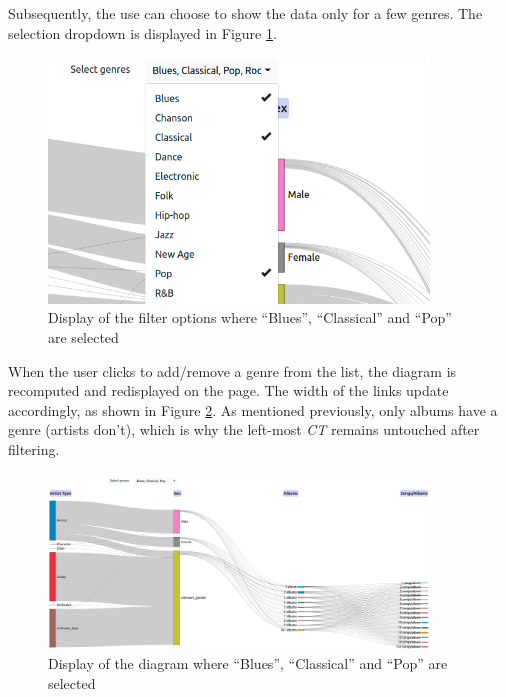 \documentclass[a4paper, 11pt, oneside]{article}
\newcommand{\ct}{\textit{CT }}
\begin{document}
Subsequently, the use can choose to show the data only for a few genres. The selection dropdown is displayed in Figure \ref{fig:joris_sankey_filter-options}.

\begin{figure}[ht]
    \centering
    \includegraphics[width=0.9\textwidth]{Images/joris-sankey-filter-options.png}
    \caption{Display of the filter options where ``Blues'', ``Classical'' and ``Pop'' are selected}
    \label{fig:joris_sankey_filter-options}
\end{figure}

When the user clicks to add/remove a genre from the list, the diagram is recomputed and redisplayed on the page. The width of the links update accordingly, as shown in Figure \ref{fig:joris_sankey_filter-result}. As mentioned previously, only albums have a genre (artists don't), which is why the left-most \ct remains untouched after filtering.

\begin{figure}[ht]
    \centering
    \includegraphics[width=0.9\textwidth]{Images/joris-sankey-filter-result.png}
    \caption{Display of the diagram where ``Blues'', ``Classical'' and ``Pop'' are selected}
    \label{fig:joris_sankey_filter-result}
\end{figure}
\end{document}
